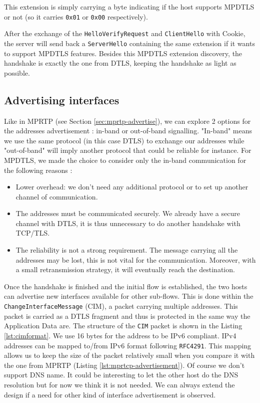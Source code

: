 This extension is simply carrying a byte indicating if the host supports MPDTLS or not (so it carries \texttt{0x01} or \texttt{0x00} respectively).

After the exchange of the \texttt{HelloVerifyRequest} and \texttt{ClientHello} with Cookie, the server will send back a \texttt{ServerHello} containing the same extension if it wants to support MPDTLS features. Besides this MPDTLS extension discovery, the handshake is exactly the one from DTLS, keeping the handshake as light as possible.

\subsection{Advertising interfaces}
\label{sec:advertise}

Like in MPRTP (see Section \ref{sec:mprtp-advertise}), we can explore 2 options for the addresses advertisement : in-band or out-of-band signalling. "In-band" means we use the same protocol (in this case DTLS) to exchange our addresses while "out-of-band" will imply another protocol that could be reliable for instance. For MPDTLS, we made the choice to consider only the in-band communication for the following reasons : 

\begin{itemize}
\item Lower overhead: we don't need any additional protocol or to set up another channel of communication.
\item The addresses must be communicated securely. We already have a secure channel with DTLS, it is thus unnecessary to do another handshake with TCP/TLS.
\item The reliability is not a strong requirement. The message carrying all the addresses may be lost, this is not vital for the communication. Moreover, with a small retransmission strategy, it will eventually reach the destination.
\end{itemize}


Once the handshake is finished and the initial flow is established, the two hosts can advertise new interfaces available for other sub-flows. This is done within the \texttt{ChangeInterfaceMessage} (CIM), a packet carrying multiple addresses. This packet is carried as a DTLS fragment and thus is protected in the same way the Application Data are. The structure of the \texttt{CIM} packet is shown in the Listing \ref{lst:cimformat}. We use 16 bytes for the address to be IPv6 compliant. IPv4 addresses can be mapped to/from IPv6 format following \texttt{RFC4291}\cite{rfc4291}. This mapping allows us to keep the size of the packet relatively small when you compare it with the one from MPRTP (Listing \ref{lst:mprtcp-advertisement}). Of course we don't support DNS name. It could be interesting to let the other host do the DNS resolution but for now we think it is not needed. We can always extend the design if a need for other kind of interface advertisement is observed.


